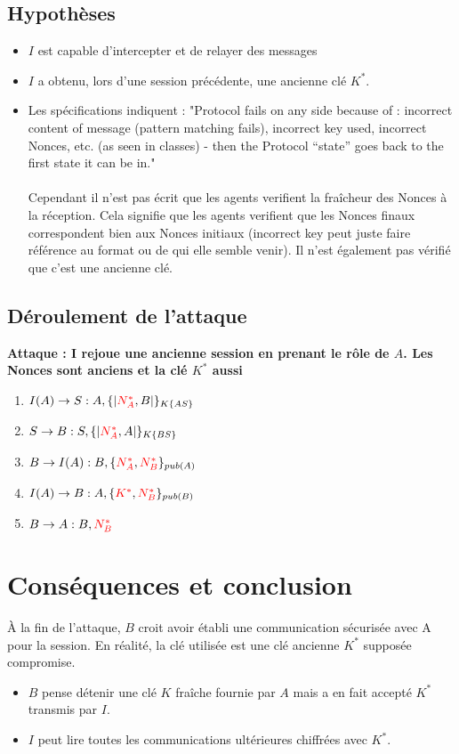 \documentclass[11pt]{article}
\begin{document}
\subsection{Hypothèses}
\begin{itemize}
    \item $I$ est capable d'intercepter et de relayer des messages 
    \item $I$ a obtenu, lors d'une session précédente, une ancienne clé $K^*$.
    \item Les spécifications indiquent :  "Protocol fails on any side because of : incorrect content of message (pattern matching fails), incorrect key used, incorrect Nonces, etc. (as seen in classes) - then the Protocol “state” goes back to the first state it can be in." \\ \\
    Cependant il n'est pas écrit que les agents verifient la fraîcheur des Nonces à la réception. Cela signifie que les agents verifient que les Nonces finaux correspondent bien aux Nonces initiaux (incorrect key peut juste faire référence au format ou de qui elle semble venir). Il n'est également pas vérifié que c'est une ancienne clé.

    

\end{itemize}

\subsection{Déroulement de l'attaque}

\textbf{Attaque : I rejoue une ancienne session en prenant le rôle de $A$. Les Nonces sont anciens et la clé $K^*$ aussi}

\begin{enumerate}
    \item $I(A) \rightarrow S : A, \{|\textcolor{red}{N_A^*},B|\}_{K\{AS\}}$
    \item $S \rightarrow B : S, \{|\textcolor{red}{N_A^*},A|\}_{K\{BS\}}$
    \item $B \rightarrow I(A) : B, \{\textcolor{red}{N_A^*},\textcolor{red}{N_B^*}\}_{pub(A)}$
    \item $I(A) \rightarrow B : A, \{\textcolor{red}{K^*},\textcolor{red}{N_B^*}\}_{pub(B)}$
    \item $B \rightarrow A : B,\textcolor{red}{N_B^*}$
\end{enumerate}


\section{Conséquences et conclusion}

\noindent
À la fin de l'attaque, $B$ croit avoir établi une communication sécurisée avec A pour la session. En réalité, la clé utilisée est une clé ancienne $K^*$ supposée compromise.

\begin{itemize}
    \item $B$ pense détenir une clé $K$ fraîche fournie par $A$ mais a en fait accepté $K^*$ transmis par $I$.
    \item $I$ peut lire toutes les communications ultérieures chiffrées avec $K^*$.
\end{itemize}
\end{document}
